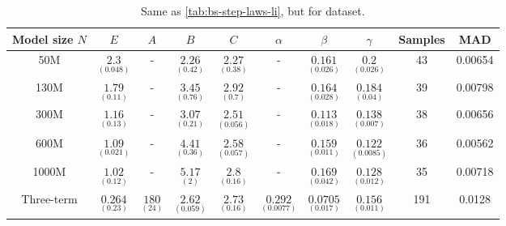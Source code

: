 %
\begin{table}[H]
\centering
\caption{Same as \cref{tab:bs-step-laws-li}, but for \oellm{} dataset.}
\label{tab:bs-step-laws-oellm}
\begin{tabular}{|c|cccc|ccc||cc|}
\hline
Model size $N$ & $E$ & $A$ & $B$ & $C$ & $\alpha$ & $\beta$ & $\gamma$ & Samples & MAD \\
\hline \hline
50M & $\underset{(0.048)}{2.3}$ & - & $\underset{(0.42)}{2.26}$ & $\underset{(0.38)}{2.27}$ & - & $\underset{(0.026)}{0.161}$ & $\underset{(0.026)}{0.2}$ & 43 & 0.00654 \\[10pt]
130M & $\underset{(0.11)}{1.79}$ & - & $\underset{(0.76)}{3.45}$ & $\underset{(0.7)}{2.92}$ & - & $\underset{(0.028)}{0.164}$ & $\underset{(0.04)}{0.184}$ & 39 & 0.00798 \\[10pt]
300M & $\underset{(0.13)}{1.16}$ & - & $\underset{(0.21)}{3.07}$ & $\underset{(0.056)}{2.51}$ & - & $\underset{(0.018)}{0.113}$ & $\underset{(0.007)}{0.138}$ & 38 & 0.00656 \\[10pt]
600M & $\underset{(0.021)}{1.09}$ & - & $\underset{(0.36)}{4.41}$ & $\underset{(0.057)}{2.58}$ & - & $\underset{(0.011)}{0.159}$ & $\underset{(0.0085)}{0.122}$ & 36 & 0.00562 \\[10pt]
1000M & $\underset{(0.12)}{1.02}$ & - & $\underset{(2)}{5.17}$ & $\underset{(0.16)}{2.8}$ & - & $\underset{(0.042)}{0.169}$ & $\underset{(0.012)}{0.128}$ & 35 & 0.00718 \\[10pt]
\hline \hline
Three-term & $\underset{(0.23)}{0.264}$ & $\underset{(24)}{180}$ & $\underset{(0.059)}{2.62}$ & $\underset{(0.16)}{2.73}$ & $\underset{(0.0077)}{0.292}$ & $\underset{(0.017)}{0.0705}$ & $\underset{(0.011)}{0.156}$ & 191 & 0.0128 \\[10pt]
\hline
\end{tabular}
\end{table}
%
%
%
